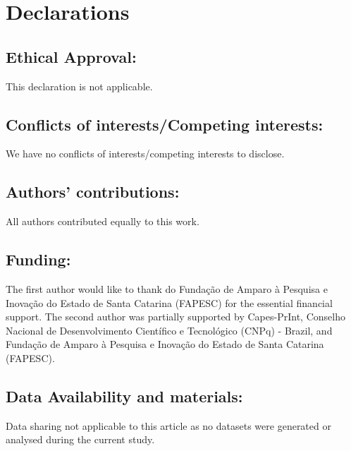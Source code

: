 \documentclass[12pt, reqno]{amsart}
\theoremstyle{definition}
\theoremstyle{remark}
\numberwithin{equation}{section}
\begin{document}
\medskip

\section{Declarations}

\subsection*{Ethical Approval:}

This declaration is not applicable.

\subsection*{Conflicts of interests/Competing interests:} We have no conflicts of interests/competing interests to disclose.

\subsection*{Authors' contributions:}

All authors contributed equally to this work. 


\subsection*{Funding:}
The first author would like to thank do Fundação de Amparo à Pesquisa e Inovação do Estado de Santa Catarina (FAPESC) for the essential financial support. The second author was partially supported by Capes-PrInt, Conselho Nacional de Desenvolvimento Cient\'ifico e Tecnol\'ogico (CNPq) - Brazil, and Funda\c{c}\~ao de Amparo \`a Pesquisa e Inova\c{c}\~ao do Estado de Santa Catarina (FAPESC).

\subsection*{Data Availability and materials:} Data sharing not applicable to this article as no datasets were generated or analysed during the current study.





%

\end{document}
